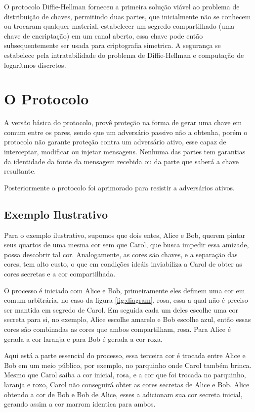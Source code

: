 \documentclass{article}
\begin{document}
O protocolo Diffie-Hellman forneceu a primeira solução viável ao problema
de distribuição de chaves, permitindo duas partes, que inicialmente não se
conhecem ou trocaram qualquer material, estabelecer um segredo compartilhado
(uma chave de encriptação) em um canal aberto, essa chave pode então
subsequentemente ser usada para criptografia simetrica. A segurança se
estabelece pela intratabilidade do problema de Diffie-Hellman e computação de
logarítmos discretos\cite{katz1996handbook}.

\section{O Protocolo}%
\label{sec:o_protocolo}



A versão básica do protocolo, provê proteção na forma de gerar uma
chave em comum entre os pares, sendo que um adversário passivo não a obtenha,
porém o protocolo não garante proteção contra um adversário ativo, esse capaz
de interceptar, modificar ou injetar mensagens. Nenhuma das partes tem
garantias da identidade da fonte da mensagem recebida ou da parte que saberá
a chave resultante\cite{katz1996handbook}.

Posteriormente o protocolo foi aprimorado para resistir a adversários ativos.

\subsection{Exemplo Ilustrativo}%
\label{sub:exemplo}
Para o exemplo ilustrativo, supomos que dois entes, Alice e Bob, querem pintar
seus quartos de uma mesma cor sem que Carol, que busca impedir essa amizade,
possa descobrir tal cor. Analogamente, as cores são chaves, e a separação das
cores, tem alto custo, o que em condições ideáis inviabiliza a Carol de obter
as cores secretas e a cor compartilhada.

O processo é iniciado com Alice e Bob, primeiramente eles definem
uma cor em comum arbitrária, no caso da figura \ref{fig:diagram}, rosa, essa
a qual não é preciso ser mantida em segredo de Carol. Em seguida cada um deles
escolhe uma cor secreta para si, no exemplo, Alice escolhe amarelo e Bob
escolhe azul, então essas cores são combinadas as cores que ambos compartilham,
rosa. Para Alice é gerada a cor laranja e para Bob é gerada a cor roxa.

Aqui está a parte essencial do processo, essa terceira cor é trocada entre
Alice e Bob em um meio público, por exemplo, no parquinho onde Carol também
brinca. Mesmo que Carol saiba a cor inicial, rosa, e a cor que foi trocada no
parquinho, laranja e roxo, Carol não conseguirá obter as cores secretas de
Alice e Bob. Alice obtendo a cor de Bob e Bob de Alice, esses a adicionam sua
cor secreta inicial, gerando assim a cor marrom identica para ambos.
\end{document}
